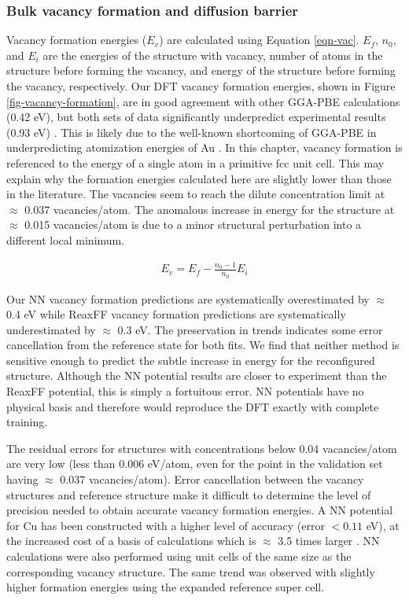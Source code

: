 \documentclass[12pt]{cmuthesis}
\begin{document}
\subsubsection{Bulk vacancy formation and diffusion barrier}
\label{sec:org5a82ec9}
Vacancy formation energies (\(E_v\)) are calculated using Equation \ref{eqn-vac}. \(E_f\), \(n_0\), and \(E_i\) are the energies of the structure with vacancy, number of atoms in the structure before forming the vacancy, and energy of the structure before forming the vacancy, respectively. Our DFT vacancy formation energies, shown in Figure \ref{fig-vacancy-formation}, are in good agreement with other GGA-PBE calculations (0.42 eV), but both sets of data significantly underpredict experimental results (0.93 eV) \cite{xing-2014-vacan-format}. This is likely due to the well-known shortcoming of GGA-PBE in underpredicting atomization energies of Au \cite{schimka-2013-lattic-const}. In this chapter, vacancy formation is referenced to the energy of a single atom in a primitive fcc unit cell. This may explain why the formation energies calculated here are slightly lower than those in the literature. The vacancies seem to reach the dilute concentration limit at \(\approx\) 0.037 vacancies/atom. The anomalous increase in energy for the structure at \(\approx\) 0.015 vacancies/atom is due to a minor structural perturbation into a different local minimum.

\begin{eqnarray}
E_v = E_f - \frac{n_0 - 1}{n_0} E_i \label{eqn-vac}
\end{eqnarray}

Our NN vacancy formation predictions are systematically overestimated by \(\approx\) 0.4 eV while ReaxFF vacancy formation predictions are systematically underestimated by \(\approx\) 0.3 eV. The preservation in trends indicates some error cancellation from the reference state for both fits. We find that neither method is sensitive enough to predict the subtle increase in energy for the reconfigured structure. Although the NN potential results are closer to experiment than the ReaxFF potential, this is simply a fortuitous error.  NN potentials have no physical basis and therefore would reproduce the DFT exactly with complete training.

The residual errors for structures with concentrations below 0.04 vacancies/atom are very low (less than 0.006 eV/atom, even for the point in the validation set having \(\approx\) 0.037 vacancies/atom). Error cancellation between the vacancy structures and reference structure make it difficult to determine the level of precision needed to obtain accurate vacancy formation energies. A NN potential for Cu has been constructed with a higher level of accuracy (error \(< 0.11\) eV), at the increased cost of a basis of calculations which is \(\approx\) 3.5 times larger \cite{artrith-2012-high}. NN calculations were also performed using unit cells of the same size as the corresponding vacancy structure. The same trend was observed with slightly higher formation energies using the expanded reference super cell.
\end{document}
